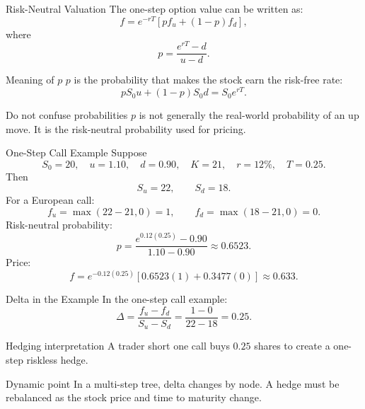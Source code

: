 \documentclass[aspectratio=169,11pt]{beamer}
\begin{document}
\begin{frame}{Risk-Neutral Valuation}
    The one-step option value can be written as:
    \[
        f=e^{-rT}\left[p f_u+(1-p)f_d\right],
    \]
    where
    \[
        p=\frac{e^{rT}-d}{u-d}.
    \]

    \begin{block}{Meaning of \(p\)}
        \(p\) is the probability that makes the stock earn the risk-free rate:
        \[
            pS_0u+(1-p)S_0d=S_0e^{rT}.
        \]
    \end{block}

    \begin{alertblock}{Do not confuse probabilities}
        \(p\) is not generally the real-world probability of an up move.
        It is the risk-neutral probability used for pricing.
    \end{alertblock}
\end{frame}

\begin{frame}{One-Step Call Example}
    \small
    Suppose
    \[
        S_0=20,\quad u=1.10,\quad d=0.90,\quad K=21,\quad r=12\%,\quad T=0.25.
    \]
    Then
    \[
        S_u=22,\qquad S_d=18.
    \]
    For a European call:
    \[
        f_u=\max(22-21,0)=1,
        \qquad
        f_d=\max(18-21,0)=0.
    \]
    Risk-neutral probability:
    \[
        p=\frac{e^{0.12(0.25)}-0.90}{1.10-0.90}\approx 0.6523.
    \]
    Price:
    \[
        f=e^{-0.12(0.25)}[0.6523(1)+0.3477(0)]\approx 0.633.
    \]
\end{frame}

\begin{frame}{Delta in the Example}
    In the one-step call example:
    \[
        \Delta=\frac{f_u-f_d}{S_u-S_d}
        =
        \frac{1-0}{22-18}
        =
        0.25.
    \]

    \begin{block}{Hedging interpretation}
        A trader short one call buys \(0.25\) shares to create a one-step riskless hedge.
    \end{block}

    \begin{alertblock}{Dynamic point}
        In a multi-step tree, delta changes by node.
        A hedge must be rebalanced as the stock price and time to maturity change.
    \end{alertblock}
\end{frame}
\end{document}
